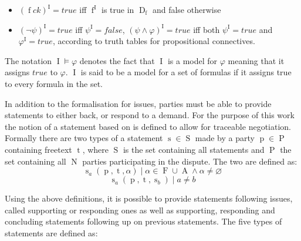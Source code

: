 \documentclass[12pt,msc,a4paper,oneside]{ucl_thesis}
\DeclareMathOperator{\Propatom}{A}
\DeclareMathOperator{\Propvar}{F}
\DeclareMathOperator{\propvar}{f}
\DeclareMathOperator{\Propdom}{D}
\DeclareMathOperator{\Interpretation}{I}
\DeclareMathOperator{\Statement}{S}
\DeclareMathOperator{\statement}{s}
\DeclareMathOperator{\statementtext}{t}
\DeclareMathOperator{\Party}{P}
\DeclareMathOperator{\party}{p}
\DeclareMathOperator{\Numparties}{N}
\begin{document}
\begin{itemize}
        \begin{itemize}
            \item $(\propvar ck)^{\Interpretation} = true$ iff $\propvar^{\Interpretation}$ is true in $\Propdom_{\propvar}$ and false otherwise
            \item $(\neg\psi)^{\Interpretation} = true$ iff $\psi^{\Interpretation} = false$, $(\psi\wedge\varphi)^{\Interpretation} = true$ iff both $\psi^{\Interpretation} = true$ and $\varphi^{\Interpretation} = true$, according to truth tables for propositional connectives.
        \end{itemize}
        
        The notation $\Interpretation\models\varphi$ denotes the fact that $\Interpretation$ is a model for $\varphi$ meaning that it assigns $true$ to $\varphi$. $\Interpretation$ is said to be a model for a set of formulas if it assigns true to every formula in the set.
\end{itemize}


In addition to the formalisation for issues, parties must be able to provide statements to either back, or respond to a demand. For the purpose of this work the notion of a statement based on \cite{Bellucci:2004:IAI:1032651.1033678} is defined to allow for traceable negotiation. Formally there are two types of a statement $\statement \in \Statement$ made by a party $\party \in \Party$ containing freetext $\statementtext$, where $\Statement$ is the set containing all statements and $\Party$ the set containing all $\Numparties$ parties participating in the dispute. The two are defined as:
\begin{equation}
    \statement_a(\party, \statementtext, \alpha) \mid \alpha \in \Propvar \cup \Propatom \wedge \alpha \neq \varnothing
    \label{eq:initial_statement}
\end{equation}
\begin{equation}
    \statement_a(\party, \statementtext, \statement_b) \mid a \neq b 
\end{equation}

Using the above definitions, it is possible to provide statements following issues, called supporting or responding ones as well as supporting, responding and concluding statements following up on previous statements. The five types of statements are defined as:
\end{document}
